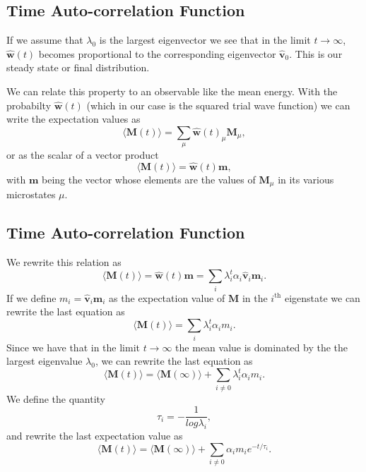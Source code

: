 \documentclass[%
oneside,                 %
final,                   %
10pt]{article}
\begin{document}
\subsection{Time Auto-correlation Function}
\begin{block}{}
If we assume that $\lambda_0$ is the largest eigenvector we see that in the limit $t\rightarrow \infty$,
$\mathbf{\hat{w}}(t)$ becomes proportional to the corresponding eigenvector 
$\mathbf{\hat{v}}_0$. This is our steady state or final distribution. 

We can relate this property to an observable like the mean energy.
With the probabilty $\mathbf{\hat{w}}(t)$ (which in our case is the squared trial wave function) we
can write the expectation values as 
\[
 \langle \mathbf{M}(t) \rangle  = \sum_{\mu} \mathbf{\hat{w}}(t)_{\mu}\mathbf{M}_{\mu},
\] 
or as the scalar of a  vector product
 \[
 \langle \mathbf{M}(t) \rangle  = \mathbf{\hat{w}}(t)\mathbf{m},
\] 
with $\mathbf{m}$ being the vector whose elements are the values of $\mathbf{M}_{\mu}$ in its 
various microstates $\mu$.
\end{block}

\subsection{Time Auto-correlation Function}
\begin{block}{}
We rewrite this relation  as
 \[
 \langle \mathbf{M}(t) \rangle  = \mathbf{\hat{w}}(t)\mathbf{m}=\sum_i\lambda_i^t\alpha_i\mathbf{\hat{v}}_i\mathbf{m}_i.
\] 
If we define $m_i=\mathbf{\hat{v}}_i\mathbf{m}_i$ as the expectation value of
$\mathbf{M}$ in the $i^{\mathrm{th}}$ eigenstate we can rewrite the last equation as
 \[
 \langle \mathbf{M}(t) \rangle  = \sum_i\lambda_i^t\alpha_im_i.
\] 
Since we have that in the limit $t\rightarrow \infty$ the mean value is dominated by the 
the largest eigenvalue $\lambda_0$, we can rewrite the last equation as
 \[
 \langle \mathbf{M}(t) \rangle  = \langle \mathbf{M}(\infty) \rangle+\sum_{i\ne 0}\lambda_i^t\alpha_im_i.
\] 
We define the quantity
\[
   \tau_i=-\frac{1}{log\lambda_i},
\]
and rewrite the last expectation value as
 \[
 \langle \mathbf{M}(t) \rangle  = \langle \mathbf{M}(\infty) \rangle+\sum_{i\ne 0}\alpha_im_ie^{-t/\tau_i}.
\label{eq:finalmeanm}
\] 
\end{block}

\end{document}
